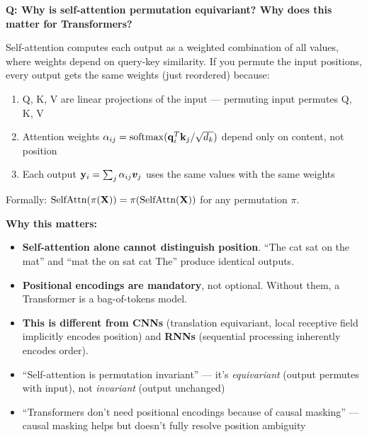 \begin{interviewq}
\textbf{Q: Why is self-attention permutation equivariant? Why does this matter for Transformers?}

 \quad {} \quad \badgefreq{\freqmed}

\stronganswer Self-attention computes each output as a weighted combination of all values, where weights depend on query-key similarity. If you permute the input positions, every output gets the same weights (just reordered) because:

\begin{enumerate}
    \item Q, K, V are linear projections of the input --- permuting input permutes Q, K, V
    \item Attention weights $\alpha_{ij} = \operatorname{softmax}(\mathbf{q}_i^T \mathbf{k}_j / \sqrt{d_k})$ depend only on content, not position
    \item Each output $\mathbf{y}_i = \sum_j \alpha_{ij} \bm{v}_j$ uses the same values with the same weights
\end{enumerate}

Formally: $\text{SelfAttn}(\pi(\mathbf{X})) = \pi(\text{SelfAttn}(\mathbf{X}))$ for any permutation $\pi$.

\textbf{Why this matters:}
\begin{itemize}
    \item \textbf{Self-attention alone cannot distinguish position}. ``The cat sat on the mat'' and ``mat the on sat cat The'' produce identical outputs.
    \item \textbf{Positional encodings are mandatory}, not optional. Without them, a Transformer is a bag-of-tokens model.
    \item \textbf{This is different from CNNs} (translation equivariant, local receptive field implicitly encodes position) and \textbf{RNNs} (sequential processing inherently encodes order).
\end{itemize}

\redflags
\begin{itemize}
    \item ``Self-attention is permutation invariant'' --- it's \textit{equivariant} (output permutes with input), not \textit{invariant} (output unchanged)
    \item ``Transformers don't need positional encodings because of causal masking'' --- causal masking helps but doesn't fully resolve position ambiguity
\end{itemize}


\end{interviewq}
